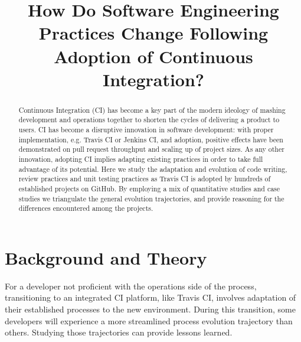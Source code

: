 \documentclass[conference]{IEEEtran}
\begin{document}
\title{How Do Software Engineering Practices
Change Following Adoption of Continuous Integration?}

\author
{
\and
{}
\and
{}
\and
{}
\and
{}
}
\maketitle
\begin{abstract}
Continuous Integration (CI) has become a key part of the modern ideology of mashing development and operations together to shorten the cycles of delivering a product to users. CI has become a disruptive innovation in software development: with proper implementation, e.g. Travis CI or Jenkins CI, and adoption, positive effects have been demonstrated on pull request throughput and scaling up of project sizes. As any other innovation, adopting CI implies adapting existing practices in order to take full advantage of its potential. Here we study the adaptation and evolution of code writing, review practices and unit testing practices as Travis CI is adopted by hundreds of established projects on GitHub. By employing a mix of quantitative studies and case studies we triangulate the general evolution trajectories, and provide reasoning for the differences encountered among the projects.
\end{abstract}




\section{Background and Theory}

For a developer not proficient with the operations side of the process, transitioning to an integrated CI platform, like Travis CI, involves adaptation of their established processes to the new environment. During this transition, some developers will experience a more streamlined process evolution trajectory than others. Studying those trajectories can provide lessons learned.


%
\end{document}
